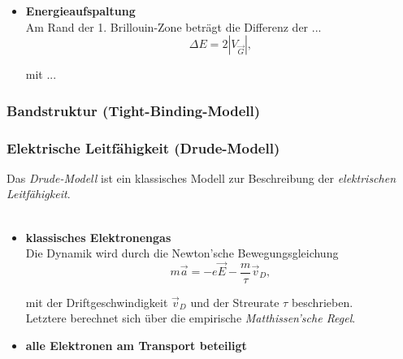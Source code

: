 \documentclass{article}
\begin{document}
	\begin{itemize}
		\item \textbf{Energieaufspaltung}\\
		Am Rand der 1. Brillouin-Zone beträgt die Differenz der ...
			\begin{equation}
				\Delta E = 2 |V_{\vec{G}}|,
			\end{equation}
		
		mit ...
	\end{itemize}






\newpage


\subsubsection{Bandstruktur (Tight-Binding-Modell)}


\newpage


\subsubsection{Elektrische Leitfähigkeit (Drude-Modell)}
Das \textit{Drude-Modell} ist ein klassisches Modell zur Beschreibung der \textit{elektrischen Leitfähigkeit}.\\
\\
	\begin{itemize}
		\item \textbf{klassisches Elektronengas}\\
		Die Dynamik wird durch die Newton'sche Bewegungsgleichung
			\begin{equation}
				m\vec{a} = -e\vec{E} - \frac{m}{\tau}\vec{v}_D,
			\end{equation}
		
		mit der Driftgeschwindigkeit $\vec{v}_D$ und der Streurate $\tau$ beschrieben.\\
		Letztere berechnet sich über die empirische \textit{Matthissen'sche Regel}.


		\item \textbf{alle Elektronen am Transport beteiligt}
	\end{itemize}
	
\end{document}
